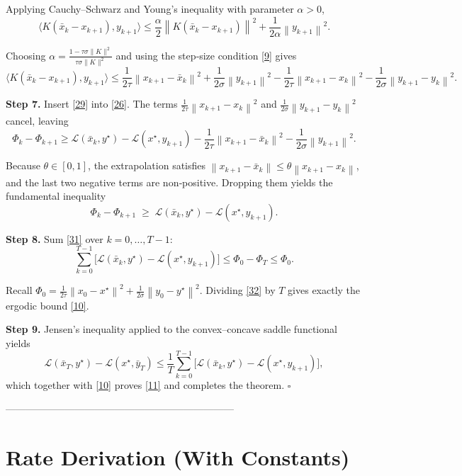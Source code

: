 \documentclass{article}
\newcommand{\inner}[2]{\langle #1,#2\rangle}
\newcommand{\norm}[1]{\left\|#1\right\|}
\begin{document}
Applying Cauchy–Schwarz and Young’s inequality with parameter $\alpha>0$,
\[
\inner{K(\bar{x}_{k}-x_{k+1})}{y_{k+1}}
\le \frac{\alpha}{2}\norm{K(\bar{x}_{k}-x_{k+1})}^{2}
+\frac{1}{2\alpha}\norm{y_{k+1}}^{2}.
\tag{28}
\]

Choosing $\alpha=\frac{1-\tau\sigma\|K\|^{2}}{\tau\sigma\|K\|^{2}}$ and using the step‑size condition \eqref{9} gives
\[
\inner{K(\bar{x}_{k}-x_{k+1})}{y_{k+1}}
\le
\frac{1}{2\tau}\norm{x_{k+1}-\bar{x}_{k}}^{2}
+\frac{1}{2\sigma}\norm{y_{k+1}}^{2}
-\frac{1}{2\tau}\norm{x_{k+1}-x_{k}}^{2}
-\frac{1}{2\sigma}\norm{y_{k+1}-y_{k}}^{2}.
\tag{29}
\]

\medskip

\noindent\textbf{Step 7.}  Insert \eqref{29} into \eqref{26}.  The terms $\frac{1}{2\tau}\norm{x_{k+1}-x_{k}}^{2}$ and $\frac{1}{2\sigma}\norm{y_{k+1}-y_{k}}^{2}$ cancel, leaving
\[
\Phi_{k}-\Phi_{k+1}
\ge
\mathcal{L}(\bar{x}_{k},y^{\star})-\mathcal{L}(x^{\star},y_{k+1})
-\frac{1}{2\tau}\norm{x_{k+1}-\bar{x}_{k}}^{2}
-\frac{1}{2\sigma}\norm{y_{k+1}}^{2}.
\tag{30}
\]

Because $\theta\in[0,1]$, the extrapolation satisfies $\norm{x_{k+1}-\bar{x}_{k}}\le \theta\norm{x_{k+1}-x_{k}}$, and the last two negative terms are non‑positive.  Dropping them yields the fundamental inequality
\[
\Phi_{k}-\Phi_{k+1}
\;\ge\;
\mathcal{L}(\bar{x}_{k},y^{\star})-\mathcal{L}(x^{\star},y_{k+1}).
\tag{31}
\]

\medskip

\noindent\textbf{Step 8.}  Sum \eqref{31} over $k=0,\dots,T-1$:
\[
\sum_{k=0}^{T-1}\bigl[\mathcal{L}(\bar{x}_{k},y^{\star})-\mathcal{L}(x^{\star},y_{k+1})\bigr]
\le
\Phi_{0}-\Phi_{T}
\le
\Phi_{0}.
\tag{32}
\]

Recall $\Phi_{0}= \frac{1}{2\tau}\norm{x_{0}-x^{\star}}^{2}
+\frac{1}{2\sigma}\norm{y_{0}-y^{\star}}^{2}$.
Dividing \eqref{32} by $T$ gives exactly the ergodic bound \eqref{10}.

\medskip

\noindent\textbf{Step 9.}  Jensen’s inequality applied to the convex–concave saddle functional yields
\[
\mathcal{L}(\bar{x}_{T},y^{\star})-\mathcal{L}(x^{\star},\bar{y}_{T})
\le
\frac{1}{T}\sum_{k=0}^{T-1}\bigl[\mathcal{L}(\bar{x}_{k},y^{\star})-\mathcal{L}(x^{\star},y_{k+1})\bigr],
\tag{33}
\]
which together with \eqref{10} proves \eqref{11} and completes the theorem. $\square$

---------------------------------------------------------------------

\section*{Rate Derivation (With Constants)}
\end{document}

